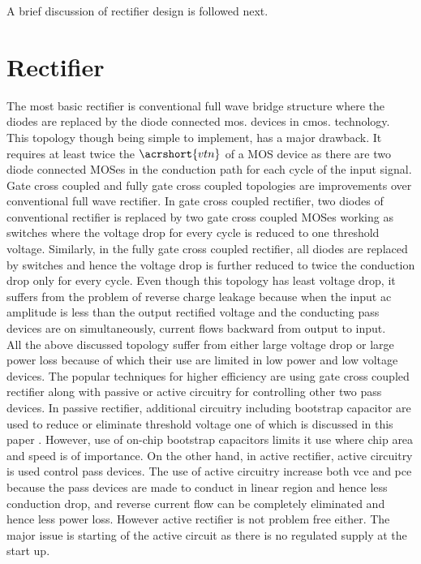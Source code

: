 \documentclass[12pt,a4paper,UKenglish]{article}
\begin{document}
A brief discussion of rectifier design is followed next.


\clearpage
\newpage

\section{Rectifier}
The most basic rectifier is conventional full wave bridge structure where the diodes are replaced by the diode connected \acrshort{mos}. devices in \acrshort{cmos}. technology. This topology though being simple to implement, has a major drawback. It requires at least twice the $\acrshort{vtn}$ of a MOS device as there are two diode connected MOSes in the conduction path for each cycle of the input signal.  \\

Gate cross coupled and fully gate cross coupled topologies are improvements over conventional full wave rectifier. In gate cross coupled rectifier, two diodes of conventional rectifier is replaced by two gate cross coupled MOSes working as switches where the voltage drop for every cycle is reduced to one threshold voltage. Similarly, in the fully gate cross coupled rectifier, all diodes are replaced by switches and hence the voltage drop is further reduced to twice the conduction drop only for every cycle. Even though this topology has least voltage drop, it suffers from the problem of reverse charge leakage because when the input ac amplitude is less than the output rectified voltage and the conducting pass devices are on simultaneously, current flows backward from output to input. \\

All the above discussed topology suffer from either large voltage drop or large power loss because of which their use are limited in low power and low voltage devices. The popular techniques for higher efficiency are using gate cross coupled rectifier along with passive or active circuitry  for controlling other two pass devices. In passive rectifier, additional circuitry including bootstrap capacitor are used to reduce or eliminate threshold voltage one of which is discussed in this paper \cite{rectboot}. However, use of on-chip bootstrap capacitors limits it use where chip area and speed is of importance. On the other hand, in active rectifier, active circuitry is used control pass devices. The use of active circuitry increase both  \gls{vce} and  \gls{pce} because the pass devices are made to conduct in linear region and hence less conduction drop, and reverse current flow can be completely eliminated and hence less power loss. However active rectifier is not problem free either. The major issue is starting of the active circuit as there is no regulated supply at the start up. \\
\end{document}
